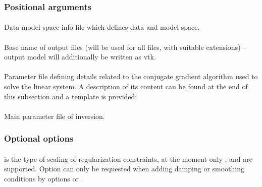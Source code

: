 \subsubsection{Positional arguments}
\paragraph{}
Data-model-space-info file which defines data and model space.
\paragraph{}
Base name of output files (will be used for all files, with suitable extensions) -- output model will additionally be written as vtk.
\paragraph{}
Parameter file defining details related to the conjugate gradient algorithm used to solve the linear system.
A description of its content can be found at the end of this subsection and a template is provided:\\
\paragraph{}
Main parameter file of inversion.
\subsubsection{Optional options}
\paragraph{}
 is the type of scaling of regularization constraints, at the moment only 
,  and  are supported. 
Option  can only be requested when adding damping or smoothing conditions by options 
 or .
